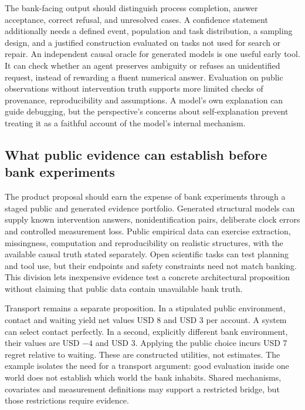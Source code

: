 The bank-facing output should distinguish process completion, answer acceptance,
correct refusal, and unresolved cases. A confidence statement additionally needs
a defined event, population and task distribution, a sampling design, and a
justified construction evaluated on tasks not used for search or repair. An
independent causal oracle for generated models is one useful early tool. It can
check whether an agent preserves ambiguity or refuses an unidentified request,
instead of rewarding a fluent numerical answer. Evaluation on public observations
without intervention truth supports more limited checks of provenance,
reproducibility and assumptions. A model's own explanation can guide debugging,
but the perspective's concerns about self-explanation prevent treating it as a
faithful account of the model's internal mechanism.

\subsection{What public evidence can establish before bank experiments}

The product proposal should earn the expense of bank experiments through a staged
public and generated evidence portfolio. Generated structural models can supply
known intervention answers, nonidentification pairs, deliberate clock errors and
controlled measurement loss. Public empirical data can exercise extraction,
missingness, computation and reproducibility on realistic structures, with the
available causal truth stated separately. Open scientific tasks can test planning
and tool use, but their endpoints and safety constraints need not match banking.
This division lets inexpensive evidence test a concrete architectural proposition
without claiming that public data contain unavailable bank truth.

Transport remains a separate proposition. In a stipulated public environment,
contact and waiting yield net values USD 8 and USD 3 per account. A system can
select contact perfectly. In a second, explicitly different bank environment,
their values are USD $-4$ and USD 3. Applying the public choice incurs USD 7
regret relative to waiting. These are constructed utilities, not estimates. The
example isolates the need for a transport argument: good evaluation inside one
world does not establish which world the bank inhabits. Shared mechanisms,
covariates and measurement definitions may support a restricted bridge, but
those restrictions require evidence.\citep{exec24_scimethod_reference}


